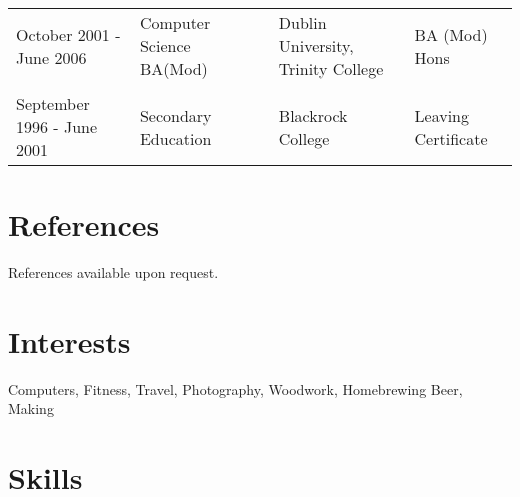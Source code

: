 \documentclass[a4paper, 11pt] {article}
\begin{document}
\begin{tabular}{l l l l l}
October 2001 - June 2006 	& Computer Science BA(Mod) &	& Dublin University, Trinity College & BA (Mod) Hons \\
			 	&			   &	&				     &		     \\
September 1996 - June 2001	& Secondary Education	   &	& Blackrock College	& Leaving Certificate	     \\
\end{tabular}

\section*{References}

References available upon request.

\pagebreak

\section*{Interests}

Computers, Fitness, Travel, Photography, Woodwork, Homebrewing Beer, Making

\section*{Skills}
\end{document}
